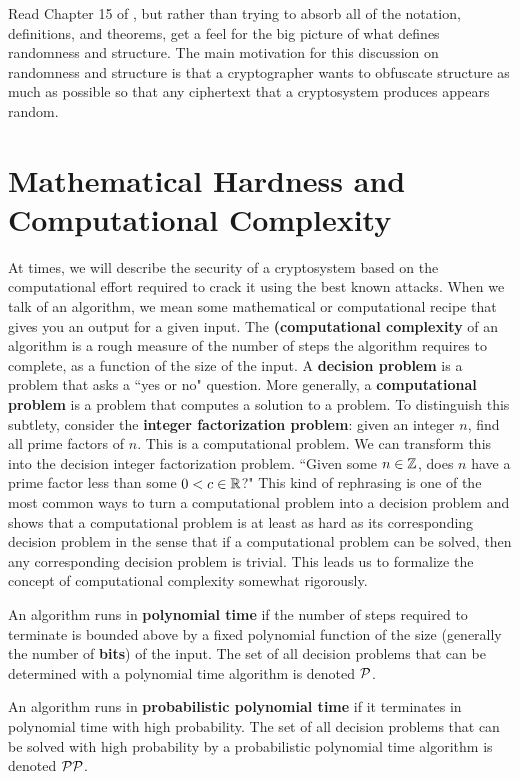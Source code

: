 Read Chapter 15 of \cite{tw}, but rather than trying to absorb all of the notation, definitions, and theorems, get a feel for the big picture of what defines randomness and structure. The main motivation for this discussion on randomness and structure is that a cryptographer wants to obfuscate structure as much as possible so that any ciphertext that a cryptosystem produces appears random.

	\section{Mathematical Hardness and Computational Complexity}
	\label{ssec:mhcc}

At times, we will describe the security of a cryptosystem based on the computational effort required to crack it using the best known attacks. When we talk of an algorithm, we mean some mathematical or computational recipe that gives you an output for a given input. The {\bf (computational complexity}  of an algorithm is a rough measure of the number of steps the algorithm requires to complete, as a function of the size of the input. A {\bf decision problem}  is a problem that asks a ``yes or no" question. More generally, a {\bf computational problem}   is a problem that computes a solution to a problem. To distinguish this subtlety, consider the {\bf integer factorization problem}:  given an integer $n$, find all prime factors of $n$. This is a computational problem. We can transform this into the decision integer factorization problem. ``Given some $n\in\mathbb{Z}$, does $n$ have a prime factor less than some $0<c\in\mathbb{R}$?" This kind of rephrasing is one of the most common ways to turn a computational problem into a decision problem and shows that a computational problem is at least as hard as its corresponding decision problem in the sense that if a computational problem can be solved, then any corresponding decision problem is trivial. This leads us to formalize the concept of computational complexity somewhat rigorously.

\begin{definition} An algorithm runs in {\bf polynomial time}  if the number of steps required to terminate is bounded above by a fixed polynomial function of the size (generally the number of {\bf bits})  of the input. The set of all decision problems that can be determined with a polynomial time algorithm is denoted $\P$. \index{$\P$}

An algorithm runs in {\bf probabilistic polynomial time}  if it terminates in polynomial time with high probability. The set of all decision problems that can be solved with high probability by a probabilistic polynomial time algorithm is denoted $\PP$. \index{$\PP$}
\end{definition}

